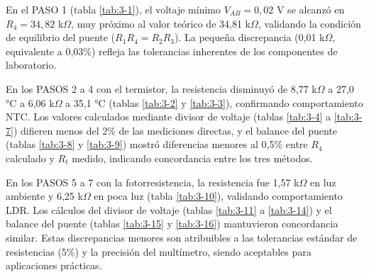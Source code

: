 \documentclass[12pt,a4paper]{article}
\begin{document}
\newpage
{}

En el PASO 1 (tabla \ref{tab:3-1}), el voltaje mínimo $V_{AB} = 0,02$ V se alcanzó en $R_4 = 34,82$ k$\Omega$, muy próximo al valor teórico de 34,81 k$\Omega$, validando la condición de equilibrio del puente ($R_1 R_4 = R_2 R_3$). La pequeña discrepancia (0,01 k$\Omega$, equivalente a 0,03\%) refleja las tolerancias inherentes de los componentes de laboratorio. 

En los PASOS 2 a 4 con el termistor, la resistencia disminuyó de 8,77 k$\Omega$ a 27,0 °C a 6,06 k$\Omega$ a 35,1 °C (tablas \ref{tab:3-2} y \ref{tab:3-3}), confirmando comportamiento NTC. Los valores calculados mediante divisor de voltaje (tablas \ref{tab:3-4} a \ref{tab:3-7}) difieren menos del 2\% de las mediciones directas, y el balance del puente (tablas \ref{tab:3-8} y \ref{tab:3-9}) mostró diferencias menores al 0,5\% entre $R_4$ calculado y $R_t$ medido, indicando concordancia entre los tres métodos.

En los PASOS 5 a 7 con la fotorresistencia, la resistencia fue 1,57 k$\Omega$ en luz ambiente y 6,25 k$\Omega$ en poca luz (tabla \ref{tab:3-10}), validando comportamiento LDR. Los cálculos del divisor de voltaje (tablas \ref{tab:3-11} a \ref{tab:3-14}) y el balance del puente (tablas \ref{tab:3-15} y \ref{tab:3-16}) mantuvieron concordancia similar. Estas discrepancias menores son atribuibles a las tolerancias estándar de resistencias (5\%) y la precisión del multímetro, siendo aceptables para aplicaciones prácticas.
\end{document}
